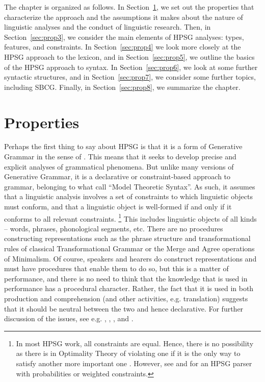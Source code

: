 \documentclass[output=paper
	        ,collection
	        ,collectionchapter
 	        ,biblatex
                ,babelshorthands
                ,newtxmath
                ,draftmode
                ,colorlinks, citecolor=brown
]{langscibook}
\begin{document}
The chapter is organized as follows. In Section~\ref{sec:prop2}, we set out the properties that characterize the approach and the assumptions it makes about the nature of linguistic analyses and the conduct of linguistic research. Then, in Section~\ref{sec:prop3}, we consider the main elements of HPSG analyses: types, features, and constraints. In Section~\ref{sec:prop4} we look more closely at the HPSG approach to the lexicon, and in Section~\ref{sec:prop5}, we outline the basics of the HPSG approach to syntax. In Section~\ref{sec:prop6}, we look at some further syntactic structures, and in Section~\ref{sec:prop7}, we consider some further topics, including SBCG. Finally, in Section~\ref{sec:prop8}, we summarize the chapter.


\section{Properties}\label{sec:prop2}
\label{prop:sec-properties}

Perhaps the first thing to say about HPSG is that it is a form of Generative Grammar in the sense of \citet[]{Chomsky57a}. This means that it seeks to develop precise and explicit analyses of grammatical phenomena. But unlike many versions of Generative Grammar, it is a declarative or constraint-based approach to grammar, belonging to what \citet{PS2001a} call ``Model Theoretic Syntax''. As such, it assumes that a linguistic analysis involves a set of constraints to which linguistic objects must conform, and that a linguistic object is well-formed if and only if it conforms to all relevant constraints.%
%
\footnote{In most HPSG work, all constraints are equal. Hence, there is no possibility as there is in Optimality Theory of violating one if it is the only way to satisfy another more important one \citep{Malouf2003a}. However, see  and  for an HPSG parser with probabilities or weighted constraints.}
%
This includes linguistic objects of all kinds – words, phrases, phonological segments, etc. There are no procedures constructing representations such as the phrase structure and transformational rules of classical Transformational Grammar or the Merge and Agree operations of Minimalism. Of course, speakers and hearers do construct representations and must have procedures that enable them to do so, but this is a matter of performance, and there is no need to think that the knowledge that is used in performance has a procedural character. Rather, the fact that it is used in both production and comprehension (and other activities, e.g. translation) suggests that it should be neutral between the two and hence declarative. For further discussion of the issues, see e.g. \citet{PS2001a}, \citet{Postal2003a}, \citet{SW2011a,SW2015a}, and .
\end{document}

